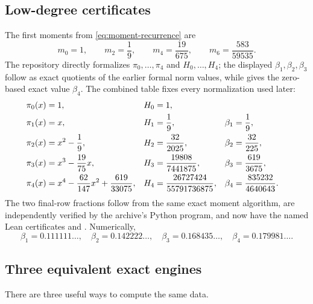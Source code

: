 \documentclass[11pt,oneside]{article}
\theoremstyle{definition}
\theoremstyle{remark}
\numberwithin{equation}{section}
\begin{document}
\subsection{Low-degree certificates}
The first moments from \cref{eq:moment-recurrence} are
\begin{equation}
 m_0=1,
 \qquad m_2=\frac19,
 \qquad m_4=\frac{19}{675},
 \qquad m_6=\frac{583}{59535}.
 \label{eq:native-first-moments}
\end{equation}
The repository directly formalizes \(\pi_0,\ldots,\pi_4\) and
\(H_0,\ldots,H_4\); the displayed \(\beta_1,\beta_2,\beta_3\) follow as exact
quotients of the earlier formal norm values, while
 gives the zero-based exact value
\(\beta_4\).  The combined table fixes every normalization used later:
\begin{align}
 \pi_0(x)&=1, & H_0&=1,\notag\\
 \pi_1(x)&=x, & H_1&=\frac19,
   & \beta_1&=\frac19,\notag\\
 \pi_2(x)&=x^2-\frac19, & H_2&=\frac{32}{2025},
   & \beta_2&=\frac{32}{225},\notag\\
 \pi_3(x)&=x^3-\frac{19}{75}x,
   & H_3&=\frac{19808}{7441875},
   & \beta_3&=\frac{619}{3675},\notag\\
 \pi_4(x)&=x^4-\frac{62}{147}x^2+\frac{619}{33075},
   & H_4&=\frac{26727424}{55791736875},
   & \beta_4&=\frac{835232}{4640643}.
 \label{eq:low-jacobi-data}
\end{align}
The two final-row fractions follow from the same exact moment algorithm, are
independently verified by the archive's Python program, and now have the named Lean
certificates  and
.  Numerically,
\begin{equation}
 \beta_1=0.111111\ldots,
 \quad \beta_2=0.142222\ldots,
 \quad \beta_3=0.168435\ldots,
 \quad \beta_4=0.179981\ldots.
 \label{eq:first-beta-decimal}
\end{equation}

\subsection{Three equivalent exact engines}
There are three useful ways to compute the same data.
\end{document}
